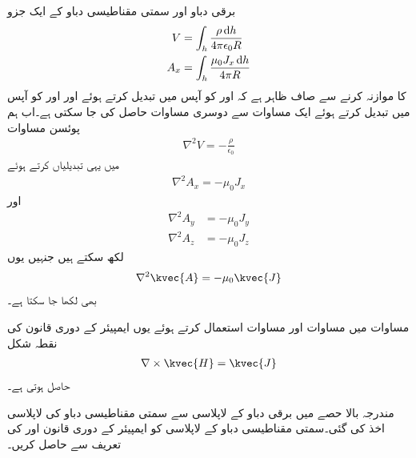 برقی دباو اور سمتی مقناطیسی دباو کے ایک جزو
\begin{align*}
V&=\int_h \frac{\rho \dif h}{4\pi \epsilon_0 R}\\
A_x&=\int_h \frac{\mu_0 J_x \dif h}{4\pi R}
\end{align*}
 کا موازنہ کرنے سے صاف ظاہر ہے کہ  اور  کو آپس میں تبدیل کرتے ہوئے اور  اور  کو آپس میں تبدیل کرتے ہوئے ایک مساوات سے دوسری مساوات حاصل کی جا سکتی ہے۔اب ہم پوئسن  مساوات
\begin{align*}
\nabla^2 V=-\frac{\rho}{\epsilon_0}
\end{align*} 
میں یہی تبدیلیاں کرتے ہوئے
\begin{align*}
\nabla^2 A_x=-\mu_0 J_x
\end{align*}
اور
\begin{align*}
\nabla^2 A_y&=-\mu_0 J_y\\
\nabla^2 A_z&=-\mu_0 J_z
\end{align*}
لکھ سکتے ہیں جنہیں یوں
\begin{align}\label{مساوات_مقناطیسی_سمتی_مقناطیسی_دباو_کی_لاپلاسی}
\nabla^2 \kvec{A}=-\mu_0 \kvec{J}
\end{align}
 بھی لکھا جا سکتا ہے۔

مساوات  میں مساوات  اور مساوات  استعمال کرتے ہوئے یوں ایمپیئر کے دوری قانون کی نقطہ شکل 
\begin{align}
\nabla \times \kvec{H}=\kvec{J}
\end{align}
حاصل ہوتی ہے۔

مندرجہ بالا حصے میں برقی دباو کے لاپلاسی سے سمتی مقناطیسی  دباو کی لاپلاسی اخذ کی گئی۔سمتی مقناطیسی دباو کے لاپلاسی کو ایمپیئر کے دوری قانون اور  کی تعریف سے حاصل کریں۔

